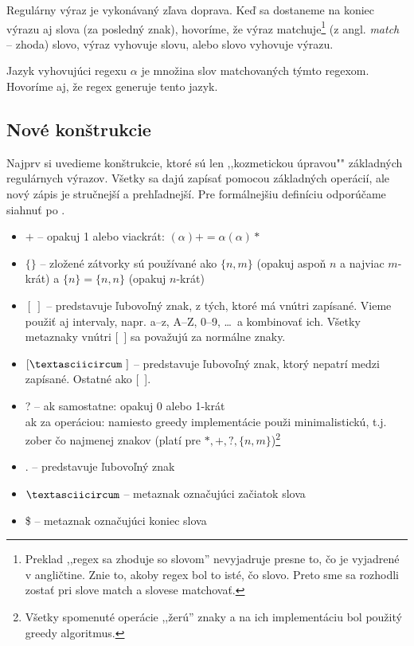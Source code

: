 Regulárny výraz je vykonávaný zľava doprava. Keď sa dostaneme na koniec výrazu aj slova (za posledný znak), hovoríme, že výraz matchuje\footnote{Preklad ,,regex sa zhoduje so slovom'' nevyjadruje presne to, čo je vyjadrené v angličtine. Znie to, akoby regex bol to isté, čo slovo. Preto sme sa rozhodli zostať pri slove match a slovese matchovať.} (z angl. \textit{match} -- zhoda) slovo, výraz vyhovuje slovu, alebo slovo vyhovuje výrazu.

Jazyk vyhovujúci regexu $\alpha$ je množina slov matchovaných týmto regexom. Hovoríme aj, že regex generuje tento jazyk.

\subsection{Nové konštrukcie}

Najprv si uvedieme konštrukcie, ktoré sú len ,,kozmetickou úpravou"" základných regulárnych výrazov. Všetky sa dajú zapísať pomocou základných operácií, ale nový zápis je stručnejší a prehľadnejší. Pre formálnejšiu definíciu odporúčame siahnuť po \cite{mojaBak}.
\begin{itemize}
\item $+$ -- opakuj 1 alebo viackrát: $(\alpha)+=\alpha(\alpha)*$
\item $\lbrace \rbrace$ -- zložené zátvorky sú používané ako $\{n,m\}$ (opakuj aspoň $n$ a najviac $m$-krát) a $\{n\}=\{n,n\}$ (opakuj $n$-krát)
\item $[~]$ -- predstavuje ľubovoľný znak, z tých, ktoré má vnútri zapísané. Vieme použiť aj intervaly, napr. a--z, A--Z, 0--9, \dots~a kombinovať ich. Všetky metaznaky vnútri [~] sa považujú za normálne znaky.
\item $[\textasciicircum~]$ -- predstavuje ľubovoľný znak, ktorý nepatrí medzi zapísané. Ostatné ako [~].
\item ? -- ak samostatne: opakuj 0 alebo 1-krát \\
ak za operáciou: namiesto greedy implementácie použi minimalistickú, t.j. zober čo najmenej znakov (platí pre $*,+,?,\lbrace n,m \rbrace$)\footnote{Všetky spomenuté operácie ,,žerú'' znaky a na ich implementáciu bol použitý greedy algoritmus.}
\item . -- predstavuje ľubovoľný znak
\item $\textasciicircum$ -- metaznak označujúci začiatok slova
\item \$ -- metaznak označujúci koniec slova
\end{itemize}

